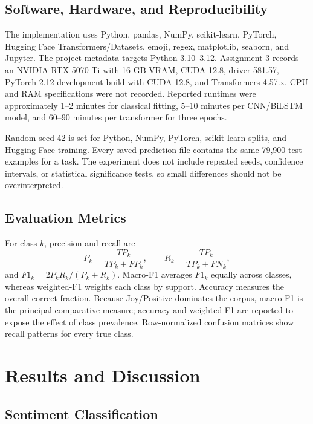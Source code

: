 \documentclass[conference]{IEEEtran}
\begin{document}
\subsection{Software, Hardware, and Reproducibility}

The implementation uses Python, pandas, NumPy, scikit-learn, PyTorch, Hugging Face Transformers/Datasets, emoji, regex, matplotlib, seaborn, and Jupyter. The project metadata targets Python 3.10--3.12. Assignment 3 records an NVIDIA RTX 5070 Ti with 16 GB VRAM, CUDA 12.8, driver 581.57, PyTorch 2.12 development build with CUDA 12.8, and Transformers 4.57.x. CPU and RAM specifications were not recorded. Reported runtimes were approximately 1--2 minutes for classical fitting, 5--10 minutes per CNN/BiLSTM model, and 60--90 minutes per transformer for three epochs.

Random seed 42 is set for Python, NumPy, PyTorch, scikit-learn splits, and Hugging Face training. Every saved prediction file contains the same 79,900 test examples for a task. The experiment does not include repeated seeds, confidence intervals, or statistical significance tests, so small differences should not be overinterpreted.

\subsection{Evaluation Metrics}

For class $k$, precision and recall are
\begin{equation}
P_k=\frac{TP_k}{TP_k+FP_k},\qquad
R_k=\frac{TP_k}{TP_k+FN_k},
\end{equation}
and $F1_k=2P_kR_k/(P_k+R_k)$. Macro-F1 averages $F1_k$ equally across classes, whereas weighted-F1 weights each class by support. Accuracy measures the overall correct fraction. Because Joy/Positive dominates the corpus, macro-F1 is the principal comparative measure; accuracy and weighted-F1 are reported to expose the effect of class prevalence. Row-normalized confusion matrices show recall patterns for every true class.

\section{Results and Discussion}



\subsection{Sentiment Classification}
\end{document}
